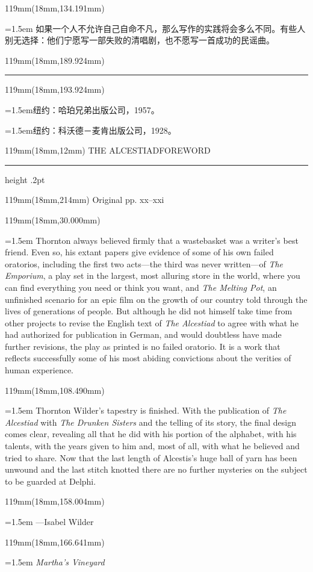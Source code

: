 \documentclass{article}
\newcommand{\ENsetup}{\normalfont\color{ink}\fontsize{11}{16.5}\selectfont\emergencystretch=1.5em}
\newcommand{\ZHsetup}{\normalfont\color{ink}\fontsize{10.5}{17}\selectfont\emergencystretch=1.5em}
\newcommand{\Note}[2]{\par\hangindent=1.5em\hangafter=1\noindent\makebox[1.5em][l]{#1}#2\par}
\newcommand{\Block}[3]{\begin{textblock*}{119mm}(18mm,#1mm){#2 #3\par}\end{textblock*}}
\newcommand{\Heading}[3]{%
  \begin{textblock*}{119mm}(18mm,12mm)
    \color{quiet}\fontsize{7.5}{10}\selectfont
    #1\hfill #2\par\vspace{3mm}\hrule height .2pt
  \end{textblock*}
  \begin{textblock*}{119mm}(18mm,214mm)
    \color{quiet}\fontsize{7}{10}\selectfont #3\hfill\thepage
  \end{textblock*}
}
\begin{document}
\Block{134.191}{\ZHsetup}{\leftskip=4mm\rightskip=3mm\kai 如果一个人不允许自己自命不凡，那么写作的实践将会多么不同。有些人别无选择：他们宁愿写一部失败的清唱剧，也不愿写一首成功的民谣曲。\par }
\begin{textblock*}{119mm}(18mm,189.924mm)\color{ink}\rule{30mm}{.25pt}\end{textblock*}
\begin{textblock*}{119mm}(18mm,193.924mm)\normalfont\color{ink}\fontsize{7.5}{11}\selectfont \Note{4}{纽约：哈珀兄弟出版公司，1957。}\vspace{1.5mm}\Note{5}{纽约：科沃德－麦肯出版公司，1928。}\end{textblock*}
\newpage
\null
\Heading{THE ALCESTIAD}{FOREWORD}{Original pp. xx–xxi}
\Block{30.000}{\ENsetup}{Thornton always believed firmly that a wastebasket was a writer's best friend. Even so, his extant papers give evidence of some of his own failed oratorios, including the first two acts—the third was never written—of \textit{The Emporium}, a play set in the largest, most alluring store in the world, where you can find everything you need or think you want, and \textit{The Melting Pot}, an unfinished scenario for an epic film on the growth of our country told through the lives of generations of people. But although he did not himself take time from other projects to revise the English text of \textit{The Alcestiad} to agree with what he had authorized for publication in German, and would doubtless have made further revisions, the play as printed is no failed oratorio. It is a work that reflects successfully some of his most abiding convictions about the verities of human experience.\par}
\Block{108.490}{\ENsetup}{Thornton Wilder's tapestry is finished. With the publication of \textit{The Alcestiad} with \textit{The Drunken Sisters} and the telling of its story, the final design comes clear, revealing all that he did with his portion of the alphabet, with his talents, with the years given to him and, most of all, with what he believed and tried to share. Now that the last length of Alcestis's huge ball of yarn has been unwound and the last stitch knotted there are no further mysteries on the subject to be guarded at Delphi.\par}
\Block{158.004}{\ENsetup}{—Isabel Wilder\par}
\Block{166.641}{\ENsetup}{\textit{Martha's Vineyard}\par}
\end{document}
